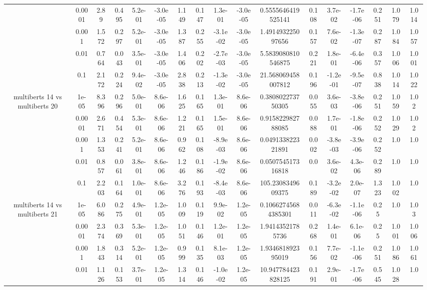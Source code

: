 \begin{tabular}{|c|c|c|c|c|c|c|c|c|c|c|c|c|c|c|c|c|}
 & 0.0001 & 2.89 & 0.495 & 5.2e-01 & -3.0e-05 & 1.149 & 0.147 & 1.3e-01 & -3.0e-05 & 0.5555646419525141 & 0.108 & 3.7e-02 & -1.7e-06 & 0.251 & 1.079 & 1.014 \\
 & 0.001 & 1.572 & 0.297 & 5.2e-01 & -3.0e-05 & 1.387 & 0.255 & -3.1e-02 & -3.0e-05 & 1.491493225097656 & 0.157 & 7.6e-02 & -1.3e-07 & 0.287 & 1.084 & 1.057 \\
 & 0.01 & 0.764 & 0.043 & 3.5e-01 & -3.0e-05 & 1.406 & 0.202 & -2.7e-03 & -3.0e-05 & 5.5839080810546875 & 0.221 & 1.8e-01 & -6.4e-06 & 0.357 & 1.006 & 1.001 \\
 & 0.1 & 2.172 & 0.224 & 9.4e-02 & -3.0e-05 & 2.838 & 0.213 & -1.3e-02 & -3.0e-05 & 21.568069458007812 & 0.196 & -1.2e-01 & -9.5e-07 & 0.838 & 1.014 & 1.022 \\
\hline
\multirow{5}{*}{multiberts 14 vs multiberts 20} & 1e-05 & 8.396 & 0.296 & 5.0e-01 & 8.6e-06 & 1.625 & 0.165 & 1.3e-01 & 8.6e-06 & 0.380802273750305 & 0.055 & 3.6e-03 & -3.8e-06 & 0.251 & 1.059 & 1.02 \\
 & 0.0001 & 2.671 & 0.454 & 5.3e-01 & 8.6e-06 & 1.221 & 0.165 & 1.5e-01 & 8.6e-06 & 0.915822982788085 & 0.088 & 1.7e-01 & -1.8e-06 & 0.252 & 1.029 & 1.02 \\
 & 0.001 & 1.353 & 0.241 & 5.2e-01 & 8.6e-06 & 0.962 & 0.108 & -8.9e-03 & 8.6e-06 & 0.049133822321891 & 0.002 & -3.8e-03 & -3.9e-06 & 0.252 & 1.0 & 1.0 \\
 & 0.01 & 0.857 & 0.061 & 3.8e-01 & 8.6e-06 & 1.246 & 0.186 & -1.9e-02 & 8.6e-06 & 0.050754517316818 & 0.0 & 3.6e-02 & 4.3e-06 & 0.289 & 1.0 & 1.0 \\
 & 0.1 & 2.203 & 0.164 & 1.0e-01 & 8.6e-06 & 3.276 & 0.193 & -8.4e-03 & 8.6e-06 & 105.2308349609375 & 0.189 & -3.2e-02 & 2.0e-07 & 1.323 & 1.002 & 1.0 \\
\hline
\multirow{5}{*}{multiberts 14 vs multiberts 21} & 1e-05 & 6.086 & 0.275 & 4.9e-01 & 1.2e-05 & 1.009 & 0.119 & 9.9e-02 & 1.2e-05 & 0.10662745684385301 & 0.011 & -6.3e-02 & -1.1e-06 & 0.25 & 1.0 & 1.03 \\
 & 0.0001 & 2.374 & 0.369 & 5.3e-01 & 1.2e-05 & 1.051 & 0.146 & 1.2e-01 & 1.2e-05 & 1.94143521785736 & 0.268 & 1.4e-01 & 6.1e-06 & 0.25 & 1.001 & 1.006 \\
 & 0.001 & 1.843 & 0.314 & 5.2e-01 & 1.2e-05 & 0.999 & 0.135 & 8.1e-03 & 1.2e-05 & 1.934681892395019 & 0.156 & 7.7e-02 & -1.1e-06 & 0.251 & 1.086 & 1.061 \\
 & 0.01 & 1.126 & 0.153 & 3.7e-01 & 1.2e-05 & 1.314 & 0.146 & -1.0e-02 & 1.2e-05 & 10.947784423828125 & 0.191 & 2.9e-01 & -1.7e-06 & 0.545 & 1.028 & 1.0 \\

\end{tabular}
